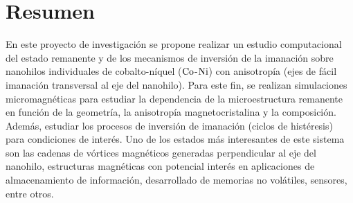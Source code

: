 \newpage
\thispagestyle{empty}
\section*{Resumen}
En este proyecto de investigación se propone realizar un estudio computacional del estado remanente y de los mecanismos de inversión de la imanación sobre nanohilos individuales de cobalto-níquel ($\ce{Co}$-$\ce{Ni}$) con anisotropía (ejes de fácil imanación transversal al eje del nanohilo). Para este fin, se realizan simulaciones micromagnéticas para estudiar la dependencia de la microestructura remanente en función de la geometría, la anisotropía magnetocristalina y la composición. Además, estudiar los procesos de inversión de imanación (ciclos de histéresis) para condiciones de interés. Uno de los estados más interesantes de este sistema son las cadenas de vórtices magnéticos generadas perpendicular al eje del nanohilo, estructuras magnéticas con potencial interés en aplicaciones de almacenamiento de información, desarrollado de memorias no volátiles, sensores, entre otros.